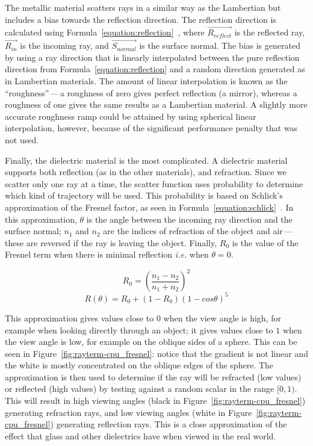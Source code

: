 The metallic material scatters rays in a similar way as the Lambertian but includes a bias towards the reflection direction.
The reflection direction is calculated using Formula~\ref{equation:reflection}~\cite{prunier2017shading}, where $\vec{R_{reflect}}$ is the reflected ray, $\vec{R_{in}}$ is the incoming ray, and $\vec{S_{normal}}$ is the surface normal.
The bias is generated by using a ray direction that is linearly interpolated between the pure reflection direction from Formula~\ref{equation:reflection} and a random direction generated as in Lambertian materials.
The amount of linear interpolation is known as the ``roughness''\,---\,a roughness of zero gives perfect reflection (a mirror), whereas a roughness of one gives the same results as a Lambertian material.
A slightly more accurate roughness ramp could be attained by using spherical linear interpolation, however, because of the significant performance penalty that was not used.

Finally, the dielectric material is the most complicated.
A dielectric material supports both reflection (as in the other materials), and refraction.
Since we scatter only one ray at a time, the scatter function uses probability to determine which kind of trajectory will be used.
This probability is based on Schlick's approximation of the Fresnel factor, as seen in Formula~\ref{equation:schlick}~\cite{schlick1994inexpensive, learnopengltheory, prunier2017shading}.
In this approximation, $\theta$ is the angle between the incoming ray direction and the surface normal; $n_1$ and $n_2$ are the indices of refraction of the object and air\,---\,these are reversed if the ray is leaving the object.
Finally, $R_0$ is the value of the Fresnel term when there is minimal reflection \textit{i.e.} when $\theta = 0$.

\begin{equation}
\label{equation:schlick_base}
  R_0 = (\frac{n_1 - n_2}{n_1 + n_2})^2
\end{equation}
\begin{equation}
\label{equation:schlick}
  R(\theta) = R_0 + (1 - R_0)(1 - cos \theta)^5
\end{equation}

This approximation gives values close to $0$ when the view angle is high, for example when looking directly through an object; it gives values close to $1$ when the view angle is low, for example on the oblique sides of a sphere.
This can be seen in Figure~\ref{fig:rayterm-cpu_fresnel}: notice that the gradient is not linear and the white is mostly concentrated on the oblique edges of the sphere.
The approximation is then used to determine if the ray will be refracted (low values) or reflected (high values) by testing against a random scalar in the range $[0, 1)$.
This will result in high viewing angles (black in Figure~\ref{fig:rayterm-cpu_fresnel}) generating refraction rays, and low viewing angles (white in Figure~\ref{fig:rayterm-cpu_fresnel}) generating reflection rays.
This is a close approximation of the effect that glass and other dielectrics have when viewed in the real world.

